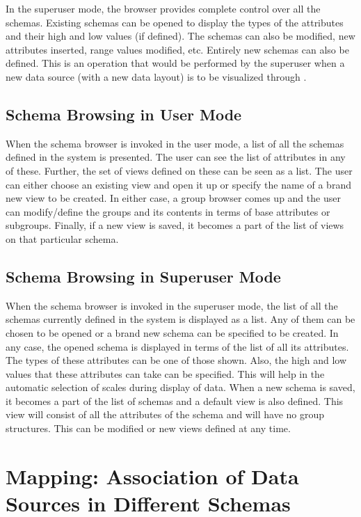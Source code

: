 In the superuser mode, the browser provides complete control over all
the schemas. Existing schemas can be opened to display the types of
the attributes and their high and low values (if defined). The schemas
can also be modified, new attributes inserted, range values modified,
etc. Entirely new schemas can also be defined.  This is an operation
that would be performed by the superuser when a new data source (with
a new data layout) is to be visualized through \Devise.

\subsection{Schema Browsing in User Mode}

When the schema browser is invoked in the user mode, a list of all the
schemas defined in the system is presented. The user can see the list
of attributes in any of these. Further, the set of views defined on
these can be seen as a list.  The user can either choose an existing
view and open it up or specify the name of a brand new view to be
created. In either case, a group browser comes up and the user can
modify/define the groups and its contents in terms of base attributes
or subgroups. Finally, if a new view is saved, it becomes a part of
the list of views on that particular schema.

\subsection{Schema Browsing in Superuser Mode}

When the schema browser is invoked in the superuser mode, the list of
all the schemas currently defined in the system is displayed as a
list. Any of them can be chosen to be opened or a brand new schema can
be specified to be created. In any case, the opened schema is
displayed in terms of the list of all its attributes. The types of
these attributes can be one of those shown. Also, the high and low
values that these attributes can take can be specified.  This will help in
the automatic selection of scales during display of data. When a new
schema is saved, it becomes a part of the list of schemas and a
default view is also defined.  This view will consist of all the
attributes of the schema and will have no group structures. This can
be modified or new views defined at any time.

\section{Mapping: Association of Data Sources in Different Schemas}

